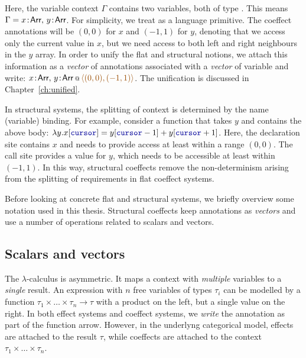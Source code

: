 Here, the variable context $\Gamma$ contains two variables, both of type . This means
$\Gamma = x\!:\!\ident{Arr},\, y\!:\!\ident{Arr}$. For simplicity, we treat  as a 
language primitive. The coeffect annotations will be $(0,0)$ for $x$ and $(-1,1)$ for $y$, 
denoting that we access only the current value in $x$, but we need access to both left and right 
neighbours in the $y$ array. In order to unify the flat and structural notions, we attach this information 
as a \emph{vector} of annotations associated with a \emph{vector} of variable and write:
$\coctx{x\!:\!\ident{Arr},\, y\!:\!\ident{Arr}}{ \aclrd{\alift{ (0,0), (-1,1) }} }$.
The unification is discussed in Chapter~\ref{ch:unified}.

In structural systems, the splitting of context is determined by the name (variable) binding. 
For example, consider a function that takes $y$ and contains the above body:
$\lambda y.x[\kvd{cursor}] = y[\kvd{cursor}-1] + y[\kvd{cursor}+1]$. Here, the declaration site
contains $x$ and needs to provide access at least within a range $(0,0)$. The call site provides
a value for $y$, which needs to be accessible at least within $(-1, 1)$. In this way, structural
coeffects remove the non-determinism arising from the splitting of requirements in flat coeffect systems.

Before looking at concrete flat and structural systems, we briefly overview 
some notation used in this thesis. Structural coeffects keep annotations as \emph{vectors} and
use a number of operations related to scalars and vectors.


\subsection{Scalars and vectors}
\label{sec:applications-strucutre-vec}

The $\lambda$-calculus is asymmetric. It maps a context with \emph{multiple} variables to a 
\emph{single} result. An expression with $n$ free variables of types $\tau_i$ can be modelled by a function 
$\tau_1 \times \ldots \times \tau_n \rightarrow \tau$ with a product on the left, but a single value
on the right. In both effect systems and coeffect systems, we \emph{write} the annotation as part of
the function arrow. However, in the underlyng categorical model, effects are attached to the result
$\tau$, while coeffects are attached to the context $\tau_1 \times \ldots \times \tau_n$.

